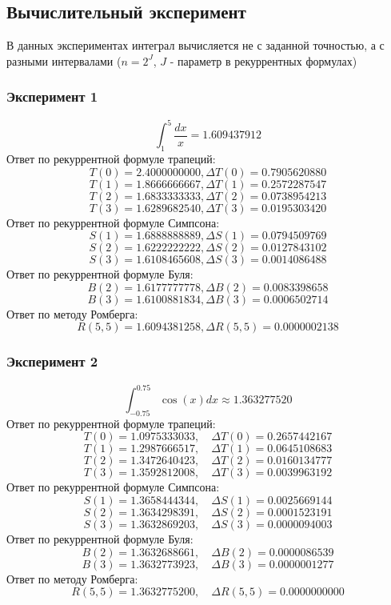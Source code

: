 \documentclass[14pt, titlepage, a4paper]{extarticle} %
\begin{document}
	\pagebreak
	\subsection*{Вычислительный эксперимент}
	
	В данных экспериментах интеграл вычисляется не с заданной точностью, а с разными интервалами ($n = 2^{J}$, $J$ - параметр в рекуррентных формулах)\vspace{5pt}\\
	\subsubsection*{Эксперимент 1}

	\[\int_{1}^{5} \frac{dx}{x} = 1.609437912\]
	Ответ по рекуррентной формуле трапеций:
	\[T(0) = 2.4000000000, \Delta T(0) = 0.7905620880\]
	\[T(1) = 1.8666666667, \Delta T(1) = 0.2572287547\]
	\[T(2) = 1.6833333333, \Delta T(2) = 0.0738954213\]
	\[T(3) = 1.6289682540, \Delta T(3) = 0.0195303420\]
	Ответ по рекуррентной формуле Симпсона:
	\[S(1) = 1.6888888889, \Delta S(1) = 0.0794509769\]
	\[S(2) = 1.6222222222, \Delta S(2) = 0.0127843102\]
	\[S(3) = 1.6108465608, \Delta S(3) = 0.0014086488\]
	Ответ по рекуррентной формуле Буля:
	\[B(2) = 1.6177777778, \Delta B(2) = 0.0083398658\]
	\[B(3) = 1.6100881834, \Delta B(3) = 0.0006502714\]
	Ответ по методу Ромберга:
	\[R(5, 5) = 1.6094381258, \Delta R(5, 5) = 0.0000002138\]
	\subsubsection*{Эксперимент 2}
	\[\int_{-0.75}^{0.75}\cos(x)dx \approx 1.363277520\]
	Ответ по рекуррентной формуле трапеций:
	\[T(0) = 1.0975333033,\quad \Delta T(0) = 0.2657442167\]
	\[T(1) = 1.2987666517,\quad \Delta T(1) = 0.0645108683\]
	\[T(2) = 1.3472640423,\quad \Delta T(2) = 0.0160134777\]
	\[T(3) = 1.3592812008,\quad \Delta T(3) = 0.0039963192\]
	Ответ по рекуррентной формуле Симпсона:
	\[S(1) = 1.3658444344,\quad \Delta S(1) = 0.0025669144\]
	\[S(2) = 1.3634298391,\quad \Delta S(2) = 0.0001523191\]
	\[S(3) = 1.3632869203,\quad \Delta S(3) = 0.0000094003\]
	Ответ по рекуррентной формуле Буля:
	\[B(2) = 1.3632688661,\quad \Delta B(2) = 0.0000086539\]
	\[B(3) = 1.3632773923,\quad \Delta B(3) = 0.0000001277\]
	Ответ по методу Ромберга:
	\[R(5, 5) = 1.3632775200,\quad \Delta R(5,5) = 0.0000000000\]
\end{document}
